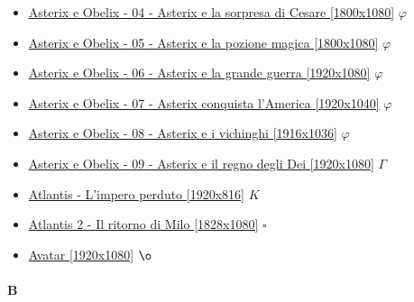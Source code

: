 \begin{itemize}
			\item \href{https://mega.nz/#!sSAGAbAA!vopnpXjpN_S681eAbX-28eiDW85yOls4B4SqHpojwfc} {Asterix e Obelix - 04 - Asterix e la sorpresa di Cesare [1800x1080]}  $\varphi$ \\
			\item \href{https://mega.nz/#!0CIUFSzL!Wvm79T_Jl5U1nugiymUxsMNf9YdUwwvGsYVzrlRaiU0} {Asterix e Obelix - 05 - Asterix e la pozione magica [1800x1080]}  $\varphi$ \\
			\item \href{https://mega.nz/#!9OZSnZRb!FHlV74EePvvaUJxxetmapHNHL5w0SzSEAt2YG4Ad51g} {Asterix e Obelix - 06 - Asterix e la grande guerra [1920x1080]}  $\varphi$ \\
			\item \href{https://mega.nz/#!kSIHiLoD!sJp6s6du8kWmvMhx6tJmL7_YNqi47C2zqpovCsatuQY} {Asterix e Obelix - 07 - Asterix conquista l'America [1920x1040]}  $\varphi$ \\
			\item \href{https://mega.nz/#!lewmDTBa!cv-VOfGCSJ6jnJi3pOBHsEqym2b2v1fGDT5L3OC-NB8} {Asterix e Obelix - 08 - Asterix e i vichinghi [1916x1036]}  $\varphi$ \\
			\item \href{https://mega.nz/#!YvJxBDhK!L0zWYilodXFbYtqDKJAYaLkmtqGDa0IWctr-N89TfcY} {Asterix e Obelix - 09 - Asterix e il regno degli Dei [1920x1080]}  $\varGamma$ \\
			\item \href{https://mega.nz/#!7kEjkSyY!BKBjAZpGICPMYU6ESWn8oMrY29coqvPnMP_EsNuEsZE} {Atlantis - L'impero perduto [1920x816]}  $K$ \\ 
			\item \href{https://mega.nz/#!C9UykQra!pvbgKcfX0UtdqVFLgqwWPbFBQdUUgfmC6YLuxDtvoFY} {Atlantis 2 - Il ritorno di Milo  [1828x1080]}  $\square$ \\ 
			\item \href{https://mega.nz/#!oo51SJQZ!YOFzGRtC9DTn5s30L229Bds0kNpiiZR1OWRvzyWecvc} {Avatar [1920x1080]}  $\o$ \\ 
			
		\end{itemize}
		
	\paragraph{B} \hypertarget{FIB}{}
	

